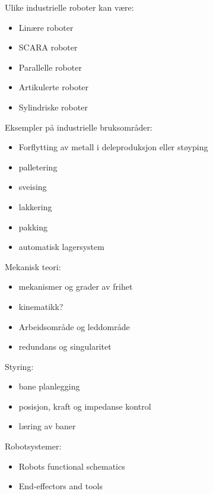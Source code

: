 Ulike industrielle roboter kan være:
\begin{itemize}%
\item Linære roboter
\item SCARA roboter
\item Parallelle roboter
\item Artikulerte roboter
\item Sylindriske roboter
\end{itemize}

Eksempler på industrielle bruksområder:


\begin{itemize}%
\item Forflytting av metall i deleproduksjon eller støyping
\item palletering
\item sveising
\item lakkering
\item pakking
\item automatisk lagersystem
\end{itemize}



Mekanisk teori:
\begin{itemize}%
\item mekanismer og grader av frihet
\item kinematikk?
\item Arbeidsområde og leddområde
\item redundans og singularitet
\end{itemize}

Styring:
\begin{itemize}%
\item bane planlegging
\item posisjon, kraft og impedanse kontrol
\item læring av baner
\end{itemize}



Robotsystemer:
\begin{itemize}%
\item Robots functional schematics
\item End-effectors and tools
\end{itemize}








